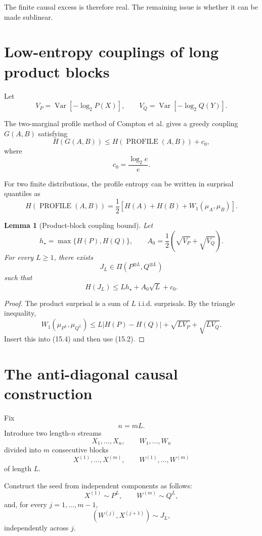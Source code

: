\documentclass[11pt,a4paper]{article}
\newtheorem{lemma}[theorem]{Lemma}
\newcommand{\Var}{\operatorname{Var}}
\newcommand{\1}{\mathbf 1}
\begin{document}
The finite causal excess is therefore real.
The remaining issue is whether it can be made sublinear.


\section{Low-entropy couplings of long product blocks}

Let
\[
V_P
=
\Var[-\log_2P(X)],
\qquad
V_Q
=
\Var[-\log_2Q(Y)].
\tag{15.1}
\]

The two-marginal profile method of Compton et al. gives a greedy coupling
\(G(A,B)\) satisfying
\[
H(G(A,B))
\le
H(\operatorname{PROFILE}(A,B))
+
c_0,
\tag{15.2}
\]
where
\[
c_0=\frac{\log_2e}{e}.
\tag{15.3}
\]

For two finite distributions, the profile entropy can be written in
surprisal quantiles as
\[
\boxed{
H(\operatorname{PROFILE}(A,B))
=
\frac12
\left[
H(A)+H(B)+W_1(\mu_A,\mu_B)
\right].
}
\tag{15.4}
\]

\begin{lemma}[Product-block coupling bound]
Let
\[
h_\star=\max\{H(P),H(Q)\},
\qquad
A_0
=
\frac12(\sqrt{V_P}+\sqrt{V_Q}).
\]
For every \(L\ge1\), there exists
\[
J_L\in\Pi(P^{\otimes L},Q^{\otimes L})
\]
such that
\[
\boxed{
H(J_L)
\le
Lh_\star+A_0\sqrt L+c_0.
}
\tag{15.5}
\]
\end{lemma}

\begin{proof}
The product surprisal is a sum of \(L\) i.i.d. surprisals.
By the triangle inequality,
\[
W_1(\mu_{P^L},\mu_{Q^L})
\le
L|H(P)-H(Q)|
+
\sqrt{LV_P}
+
\sqrt{LV_Q}.
\]
Insert this into (15.4) and then use (15.2).
\end{proof}


\section{The anti-diagonal causal construction}

Fix
\[
n=mL.
\]
Introduce two length-\(n\) streams
\[
X_1,\ldots,X_n,
\qquad
W_1,\ldots,W_n
\]
divided into \(m\) consecutive blocks
\[
X^{(1)},\ldots,X^{(m)},
\qquad
W^{(1)},\ldots,W^{(m)}
\]
of length \(L\).

Construct the seed from independent components as follows:
\[
X^{(1)}\sim P^L,
\qquad
W^{(m)}\sim Q^L,
\]
and, for every \(j=1,\ldots,m-1\),
\[
(W^{(j)},X^{(j+1)})\sim J_L,
\tag{16.1}
\]
independently across \(j\).
\end{document}
